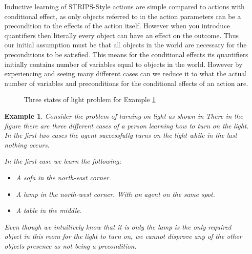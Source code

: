 \documentclass[../Master.tex]{subfiles}
\begin{document}
Inductive learning of STRIPS-Style actions are simple compared to actions
with conditional effect, as only objects referred to in the action parameters can be a precondition
to the effects of the action itself. However when you introduce quantifiers
then literally every object can have an effect on the outcome. Thus
our initial assumption must be that all objects in the world are 
necessary for the preconditions to be satisfied. This means for the conditional effects its quantifiers initially contains number of
variables equal to objects in the world. However by 
experiencing and seeing many different cases can we reduce it to what 
the actual number of variables and preconditions
for the conditional effects of an action are. 


\begin{figure}
	
	
	\caption{\label{fig:House-example}Three states of light problem for Example \ref{thm:house-example}}
	
	
	
\end{figure}

\newtheorem{thm-house-example}{Example}[section]
\begin{thm-house-example}\label{thm:house-example}
Consider the problem of turning on light as shown in 
There in the figure there are three different cases of a person learning how to turn on the
light. In the first two cases the agent successfully turns on the light while in the last nothing occurs.

In the first case we learn the following:
\begin{itemize}
	\item A sofa in the north-east corner.
	\item A lamp in the north-west corner. With an agent on the same spot.
	\item A table in the middle.
\end{itemize}
Even though we intuitively know that it is only the lamp is the only required object in this room for the light to turn on, we cannot disprove any of the other objects presence as not being a precondition. 
\end{thm-house-example}
\end{document}
